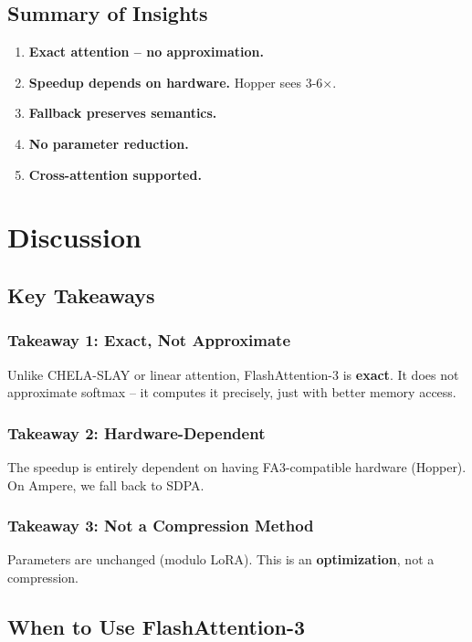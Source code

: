 \subsection{Summary of Insights}

\begin{enumerate}
\item \textbf{Exact attention -- no approximation.}
\item \textbf{Speedup depends on hardware.} Hopper sees 3-6$\times$.
\item \textbf{Fallback preserves semantics.}
\item \textbf{No parameter reduction.}
\item \textbf{Cross-attention supported.}

\end{enumerate}


\section{Discussion}

\subsection{Key Takeaways}

\subsubsection{Takeaway 1: Exact, Not Approximate}

Unlike CHELA-SLAY or linear attention, FlashAttention-3 is \textbf{exact}. It 
does not approximate softmax -- it computes it precisely, just with better 
memory access.

\subsubsection{Takeaway 2: Hardware-Dependent}

The speedup is entirely dependent on having FA3-compatible hardware 
(Hopper). On Ampere, we fall back to SDPA.

\subsubsection{Takeaway 3: Not a Compression Method}

Parameters are unchanged (modulo LoRA). This is an \textbf{optimization}, not a 
compression.

\subsection{When to Use FlashAttention-3}

